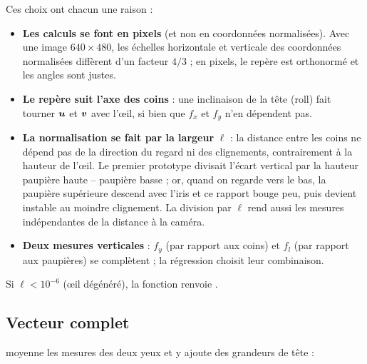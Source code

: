 Ces choix ont chacun une raison :
\begin{itemize}
  \item \textbf{Les calculs se font en pixels} (et non en coordonnées normalisées). Avec une image $640\times480$, les échelles horizontale et verticale des coordonnées normalisées diffèrent d'un facteur $4/3$ ; en pixels, le repère est orthonormé et les angles sont justes.
  \item \textbf{Le repère suit l'axe des coins} : une inclinaison de la tête (roll) fait tourner $\bm{u}$ et $\bm{v}$ avec l'œil, si bien que $f_x$ et $f_y$ n'en dépendent pas.
  \item \textbf{La normalisation se fait par la largeur} $\ell$ : la distance entre les coins ne dépend pas de la direction du regard ni des clignements, contrairement à la hauteur de l'œil. Le premier prototype divisait l'écart vertical par la hauteur paupière haute -- paupière basse ; or, quand on regarde vers le bas, la paupière supérieure descend avec l'iris et ce rapport bouge peu, puis devient instable au moindre clignement. La division par $\ell$ rend aussi les mesures indépendantes de la distance à la caméra.
  \item \textbf{Deux mesures verticales} : $f_y$ (par rapport aux coins) et $f_l$ (par rapport aux paupières) se complètent ; la régression choisit leur combinaison.
\end{itemize}
Si $\ell < 10^{-6}$ (œil dégénéré), la fonction renvoie .

\subsection{Vecteur complet}

 moyenne les mesures des deux yeux et y ajoute des grandeurs de tête :

